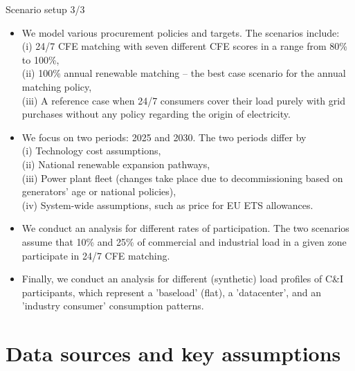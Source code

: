 \begin{frame}{Scenario setup 3/3}

  {\footnotesize 
  \begin{itemize}

  \item We model various procurement policies and targets. The scenarios include: \\
  (i) \alert{24/7 CFE matching} with seven different CFE scores in a range from 80\% to 100\%, \\
  (ii) \alert{100\% annual renewable matching} -- the best case scenario for the annual matching policy, \\
  (iii) \alert{A reference case} when 24/7 consumers cover their load purely with grid purchases 
  without any policy regarding the origin of electricity.

  \item We focus on two periods: \alert{2025} and \alert{2030}. The two periods differ by \\ 
  (i) Technology cost assumptions, \\
  (ii) National renewable expansion pathways,\\
  (iii) Power plant fleet (changes take place due to decommissioning based on generators' 
  age or national policies), \\
  (iv) System-wide assumptions, such as price for EU ETS allowances.

  \item We conduct an analysis for different rates of participation. The two scenarios 
  assume that \alert{10\%} and \alert{25\%} of commercial and industrial load
  in a given zone participate in 24/7 CFE matching.

  \item Finally, we conduct an analysis for different (synthetic) load profiles of C\&I participants, which
  represent a \alert{'baseload'} (flat), a \alert{'datacenter'}, and an \alert{'industry consumer'} consumption patterns.   

  \end{itemize}
  }
\end{frame}



\section{Data sources and key assumptions}


